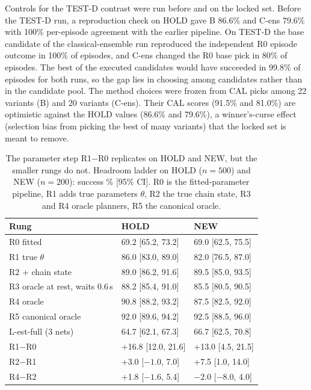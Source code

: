 Controls for the TEST-D contrast were run before and on the locked set. Before the TEST-D run, a reproduction check on HOLD gave B 86.6\% and C-ens 79.6\% with 100\% per-episode agreement with the earlier pipeline. On TEST-D the base candidate of the classical-ensemble run reproduced the independent R0 episode outcome in 100\% of episodes, and C-ens changed the R0 base pick in 80\% of episodes. The best of the executed candidates would have succeeded in 99.8\% of episodes for both runs, so the gap lies in choosing among candidates rather than in the candidate pool. The method choices were frozen from CAL picks among 22 variants (B) and 20 variants (C-ens). Their CAL scores (91.5\% and 81.0\%) are optimistic against the HOLD values (86.6\% and 79.6\%), a winner's-curse effect (selection bias from picking the best of many variants) that the locked set is meant to remove.

\begin{table}[htbp]
\centering
\caption{The parameter step R1$-$R0 replicates on HOLD and NEW, but the smaller rungs do not. Headroom ladder on HOLD ($n{=}500$) and NEW ($n{=}200$): success \% [95\% CI]. R0 is the fitted-parameter pipeline, R1 adds true parameters $\theta$, R2 the true chain state, R3 and R4 oracle planners, R5 the canonical oracle.}
\label{tab:replication}
\begin{tabular}{@{}lll@{}}
\toprule
Rung & HOLD & NEW \\ \midrule
R0 fitted & 69.2 [65.2, 73.2] & 69.0 [62.5, 75.5] \\
R1 true $\theta$ & 86.0 [83.0, 89.0] & 82.0 [76.5, 87.0] \\
R2 + chain state & 89.0 [86.2, 91.6] & 89.5 [85.0, 93.5] \\
R3 oracle at rest, waits 0.6\,s & 88.2 [85.4, 91.0] & 85.5 [80.5, 90.5] \\
R4 oracle & 90.8 [88.2, 93.2] & 87.5 [82.5, 92.0] \\
R5 canonical oracle & 92.0 [89.6, 94.2] & 92.5 [88.5, 96.0] \\
L-est-full (3 nets) & 64.7 [62.1, 67.3] & 66.7 [62.5, 70.8] \\
R1$-$R0 & +16.8 [12.0, 21.6] & +13.0 [4.5, 21.5] \\
R2$-$R1 & +3.0 [$-1.0$, 7.0] & +7.5 [1.0, 14.0] \\
R4$-$R2 & +1.8 [$-1.6$, 5.4] & $-2.0$ [$-8.0$, 4.0] \\
\bottomrule
\end{tabular}
\end{table}

